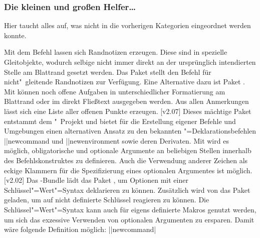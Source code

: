 \subsubsection{Die kleinen und großen Helfer\dots}
%
Hier taucht alles auf, was nicht in die vorherigen Kategorien eingeordnet 
werden konnte.
%
\begin{DeclarePackages}
  Mit dem Befehl  lassen sich Randnotizen erzeugen. Diese sind 
  in  spezielle Gleitobjekte, wodurch selbige nicht immer direkt 
  an der ursprünglich intendierten Stelle am Blattrand gesetzt werden. Das 
  Paket  stellt den Befehl  für 
  nicht"~gleitende Randnotizen zur Verfügung. Eine Alternative dazu ist Paket 
  .
  Mit  können noch offene Aufgaben in unterschiedlicher 
  Formatierung am Blattrand oder im direkt Fließtext ausgegeben werden. Aus 
  allen Anmerkungen lässt sich eine Liste aller offenen Punkte erzeugen.
  [v2.07]
  Dieses mächtige Paket entstammt dem "~Projekt und bietet für 
  die Erstellung eigener Befehle und Umgebungen einen alternativen Ansatz zu 
  den bekannten "=Deklarationsbefehlen \Macro||{newcommand} und 
  \Macro||{newenvironment} sowie deren Derivaten. Mit  wird es 
  möglich, obligatorische und optionale Argumente an beliebigen Stellen 
  innerhalb des Befehlskonstruktes zu definieren. Auch die Verwendung anderer 
  Zeichen als eckige Klammern für die Spezifizierung eines optionalen 
  Argumentes ist möglich.
[v2.02]
  Das \KOMAScript-Bundle lädt das Paket , um Optionen mit 
  einer Schlüssel"=Wert"=Syntax deklarieren zu können. Zusätzlich wird von 
  \TUDScript das Paket  geladen, um auf nicht definierte 
  Schlüssel reagieren zu können. Die Schlüssel"=Wert"=Syntax kann auch für 
  eigens definierte Makros genutzt werden, um sich das exzessive Verwenden von 
  optionalen Argumenten zu ersparen. Damit wäre folgende Definition möglich:
  \Macro||{newcommand|%
  }%
  

\end{DeclarePackages}
